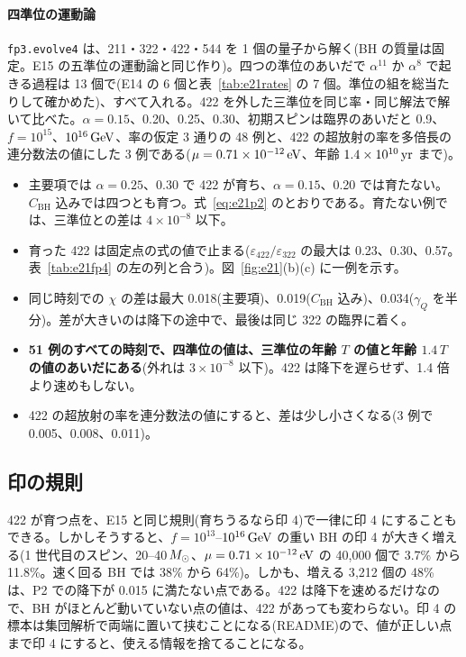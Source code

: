 \paragraph{四準位の運動論}
\texttt{fp3.evolve4} は、211・322・422・544 を 1 個の量子から解く(BH の質量は固定。E15 の五準位の運動論と同じ作り)。四つの準位のあいだで $\alpha^{11}$ か $\alpha^8$ で起きる過程は 13 個で(E14 の 6 個と表~\ref{tab:e21rates} の 7 個。準位の組を総当たりして確かめた)、すべて入れる。422 を外した三準位を同じ率・同じ解法で解いて比べた。$\alpha=0.15$、0.20、0.25、0.30、初期スピンは臨界のあいだと 0.9、$f=10^{15}$、$10^{16}\,\mathrm{GeV}$、率の仮定 3 通りの 48 例と、422 の超放射の率を多倍長の連分数法の値にした 3 例である($\mu=0.71\times10^{-12}\,\mathrm{eV}$、年齢 $1.4\times10^{10}\,\mathrm{yr}$ まで)。
\begin{itemize}
\item 主要項では $\alpha=0.25$、0.30 で 422 が育ち、$\alpha=0.15$、0.20 では育たない。$C_\mathrm{BH}$ 込みでは四つとも育つ。式~\eqref{eq:e21p2} のとおりである。育たない例では、三準位との差は $4\times10^{-8}$ 以下。
\item 育った 422 は固定点の式の値で止まる($\varepsilon_{422}/\varepsilon_{322}$ の最大は 0.23、0.30、0.57。表~\ref{tab:e21fp4} の左の列と合う)。図~\ref{fig:e21}(b)(c) に一例を示す。
\item 同じ時刻での $\chi$ の差は最大 0.018(主要項)、0.019($C_\mathrm{BH}$ 込み)、0.034($\gamma_Q$ を半分)。差が大きいのは降下の途中で、最後は同じ 322 の臨界に着く。
\item \textbf{51 例のすべての時刻で、四準位の値は、三準位の年齢 $T$ の値と年齢 $1.4\,T$ の値のあいだにある}(外れは $3\times10^{-8}$ 以下)。422 は降下を遅らせず、1.4 倍より速めもしない。
\item 422 の超放射の率を連分数法の値にすると、差は少し小さくなる(3 例で 0.005、0.008、0.011)。
\end{itemize}

\subsection{印の規則}

422 が育つ点を、E15 と同じ規則(育ちうるなら印 4)で一律に印 4 にすることもできる。しかしそうすると、$f=10^{13}$--$10^{16}\,\mathrm{GeV}$ の重い BH の印 4 が大きく増える(1 世代目のスピン、20--40$\,M_\odot$、$\mu=0.71\times10^{-12}\,\mathrm{eV}$ の 40{,}000 個で 3.7\% から 11.8\%。速く回る BH では 38\% から 64\%)。しかも、増える 3{,}212 個の 48\% は、P2 での降下が 0.015 に満たない点である。422 は降下を速めるだけなので、BH がほとんど動いていない点の値は、422 があっても変わらない。印 4 の標本は集団解析で両端に置いて挟むことになる(README)ので、値が正しい点まで印 4 にすると、使える情報を捨てることになる。

